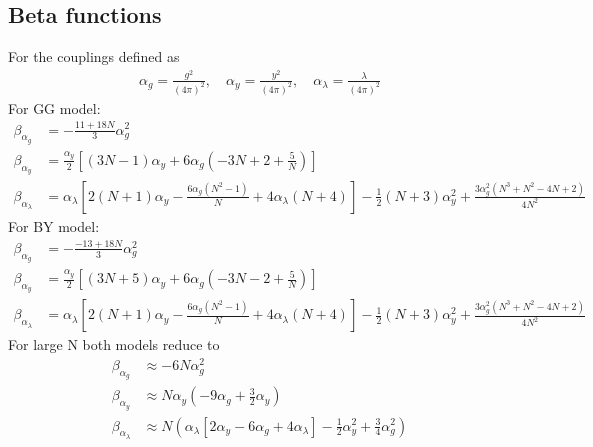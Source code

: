 \subsection{Beta functions}
For the couplings defined as 
\begin{align*}
    \alpha_g = \frac{g^2}{(4\pi)^2}, \quad \alpha_y = \frac{y^2}{(4\pi)^2}, \quad\alpha_\lambda = \frac{\lambda}{(4\pi)^2}
\end{align*}
For GG model:
\begin{align}
    \beta_{\alpha_g}&=-\frac{11+18N}{3}\alpha_g^2\\
    \beta_{\alpha_y}&= \frac{\alpha_y }{2}\left[(3 N-1)
   \alpha_y+6 \alpha_g \left(-3 N+2+\frac 5N\right)\right]\\
    \beta_{\alpha_\lambda}&=\alpha_\lambda\left[2(N+1)\alpha_y-\frac{6 \alpha_g \left(N^2-1\right)}{N}+4 \alpha_\lambda (N+4)\right]-\frac{1}{2} (N+3)\alpha_y^2+\frac{3 \alpha_g^2 \left(N^3+N^2-4 N+2\right)}{4 N^2} 
\end{align}
For BY model:
\begin{align}
    \beta_{\alpha_g}&=-\frac{-13+18N}{3}\alpha_g^2\\
    \beta_{\alpha_y}&= \frac{\alpha_y}{2}\left[(3 N+5)\alpha_y+6 \alpha_g\left(-3 N-2+\frac 5N\right) \right]
   \\
   \beta_{\alpha_\lambda}&=\alpha_\lambda\left[2(N+1)\alpha_y-\frac{6 \alpha_g 
   \left(N^2-1\right)}{N}+4 \alpha_\lambda (N+4)\right]-\frac{1}{2} (N+3)
  \alpha_y^2+\frac{3 \alpha_g^2 \left(N^3+N^2-4 N+2\right)}{4 N^2} 
\end{align}
For large N both models reduce to
\begin{align}
    \beta_{\alpha_g}&\approx-6N\alpha_g^2\\
    \beta_{\alpha_y}&\approx N\alpha_y\left(-9\alpha_g+\frac{3}{2}\alpha_y\right)\\
    \beta_{\alpha_\lambda}&\approx N\left(\alpha_\lambda\left[2\alpha_y-6 \alpha_g 
   +4 \alpha_\lambda \right]-\frac{1}{2}
  \alpha_y^2+\frac{3}{4} \alpha_g^2 \right)
\end{align}
